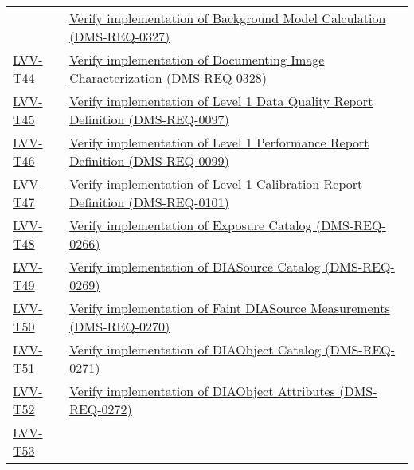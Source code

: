 \begin{longtable}[]{@{}ll@{}}
&
\href{https://jira.lsstcorp.org/secure/Tests.jspa\#/testCase/LVV-T43}{Verify
implementation of Background Model Calculation
(DMS-REQ-0327)}\tabularnewline
\protect\hyperlink{lvv-t44---verify-implementation-of--documenting-image-characterization-dms-req-0328}{LVV-T44}
&
\href{https://jira.lsstcorp.org/secure/Tests.jspa\#/testCase/LVV-T44}{Verify
implementation of Documenting Image Characterization
(DMS-REQ-0328)}\tabularnewline
\protect\hyperlink{lvv-t45---verify-implementation-of-level-1-data-quality-report-definition-dms-req-0097}{LVV-T45}
&
\href{https://jira.lsstcorp.org/secure/Tests.jspa\#/testCase/LVV-T45}{Verify
implementation of Level 1 Data Quality Report Definition
(DMS-REQ-0097)}\tabularnewline
\protect\hyperlink{lvv-t46---verify-implementation-of-level-1-performance-report-definition-dms-req-0099}{LVV-T46}
&
\href{https://jira.lsstcorp.org/secure/Tests.jspa\#/testCase/LVV-T46}{Verify
implementation of Level 1 Performance Report Definition
(DMS-REQ-0099)}\tabularnewline
\protect\hyperlink{lvv-t47---verify--implementation-of-level-1-calibration-report-definition-dms-req-0101}{LVV-T47}
&
\href{https://jira.lsstcorp.org/secure/Tests.jspa\#/testCase/LVV-T47}{Verify
implementation of Level 1 Calibration Report Definition
(DMS-REQ-0101)}\tabularnewline
\protect\hyperlink{lvv-t48---verify-implementation-of-exposure-catalog-dms-req-0266}{LVV-T48}
&
\href{https://jira.lsstcorp.org/secure/Tests.jspa\#/testCase/LVV-T48}{Verify
implementation of Exposure Catalog (DMS-REQ-0266)}\tabularnewline
\protect\hyperlink{lvv-t49---verify-implementation-of-diasource-catalog-dms-req-0269}{LVV-T49}
&
\href{https://jira.lsstcorp.org/secure/Tests.jspa\#/testCase/LVV-T49}{Verify
implementation of DIASource Catalog (DMS-REQ-0269)}\tabularnewline
\protect\hyperlink{lvv-t50---verify-implementation-of-faint-diasource-measurements-dms-req-0270}{LVV-T50}
&
\href{https://jira.lsstcorp.org/secure/Tests.jspa\#/testCase/LVV-T50}{Verify
implementation of Faint DIASource Measurements
(DMS-REQ-0270)}\tabularnewline
\protect\hyperlink{lvv-t51---verify-implementation-of-diaobject-catalog-dms-req-0271}{LVV-T51}
&
\href{https://jira.lsstcorp.org/secure/Tests.jspa\#/testCase/LVV-T51}{Verify
implementation of DIAObject Catalog (DMS-REQ-0271)}\tabularnewline
\protect\hyperlink{lvv-t52---verify-implementation-of-diaobject-attributes-dms-req-0272}{LVV-T52}
&
\href{https://jira.lsstcorp.org/secure/Tests.jspa\#/testCase/LVV-T52}{Verify
implementation of DIAObject Attributes (DMS-REQ-0272)}\tabularnewline
\protect\hyperlink{lvv-t53---verify-implementation-of-ssobject-catalog-dms-req-0273}{LVV-T53}

\end{longtable}
